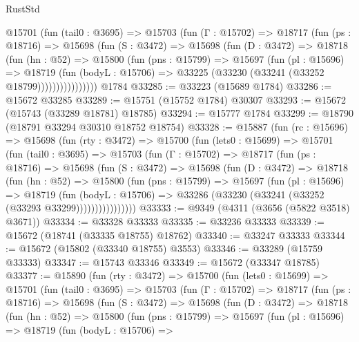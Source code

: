 \begin{lexlean}{RustStd}
\begin{coremodule}
          @15701
            (fun (tail0 : @3695) =>
            @15703
              (fun (Γ : @15702) =>
              @18717
                (fun (ps : @18716) =>
                @15698
                  (fun (S : @3472) =>
                  @15698
                    (fun (D : @3472) =>
                    @18718
                      (fun (hn : @52) =>
                      @15800
                        (fun (pns : @15799) =>
                        @15697
                          (fun (pl : @15696) =>
                          @18719
                            (fun (bodyL : @15706) =>
                            @33225 (@33230 (@33241 (@33252 @18799))))))))))))))))
    @1784
@33285 := @33223 (@15689 @1784)
@33286 := @15672 @33285
@33289 := @15751 (@15752 @1784) @30307
@33293 := @15672 (@15743 (@33289 @18781) @18785)
@33294 := @15777 @1784
@33299 := @18790 (@18791 @33294 @30310 @18752 @18754)
@33328 := @15887
    (fun (rc : @15696) =>
    @15698
      (fun (rty : @3472) =>
      @15700
        (fun (lets0 : @15699) =>
        @15701
          (fun (tail0 : @3695) =>
          @15703
            (fun (Γ : @15702) =>
            @18717
              (fun (ps : @18716) =>
              @15698
                (fun (S : @3472) =>
                @15698
                  (fun (D : @3472) =>
                  @18718
                    (fun (hn : @52) =>
                    @15800
                      (fun (pns : @15799) =>
                      @15697
                        (fun (pl : @15696) =>
                        @18719
                          (fun (bodyL : @15706) =>
                          @33286 (@33230 (@33241 (@33252 (@33293 @33299))))))))))))))))
@33333 := @9349 (@4311 (@3656 (@5822 @3518) @3671))
@33334 := @33328 @33333
@33335 := @33236 @33333
@33339 := @15672 (@18741 (@33335 @18755) @18762)
@33340 := @33247 @33333
@33344 := @15672 (@15802 (@33340 @18755) @3553)
@33346 := @33289 (@15759 @33333)
@33347 := @15743 @33346
@33349 := @15672 (@33347 @18785)
@33377 := @15890
    (fun (rty : @3472) =>
    @15700
      (fun (lets0 : @15699) =>
      @15701
        (fun (tail0 : @3695) =>
        @15703
          (fun (Γ : @15702) =>
          @18717
            (fun (ps : @18716) =>
            @15698
              (fun (S : @3472) =>
              @15698
                (fun (D : @3472) =>
                @18718
                  (fun (hn : @52) =>
                  @15800
                    (fun (pns : @15799) =>
                    @15697
                      (fun (pl : @15696) =>
                      @18719
                        (fun (bodyL : @15706) =>

\end{coremodule}
\end{lexlean}
